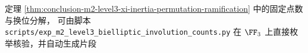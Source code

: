 \begin{remark}[有限组合核验脚本]\label{rem:conclusion-m2-level3-xi-involution-audit-script}
定理 \ref{thm:conclusion-m2-level3-xi-inertia-permutation-ramification} 中的固定点数与换位分解，
可由脚本 \texttt{scripts/exp\_m2\_level3\_bielliptic\_involution\_counts.py} 在 \(\FF_3\) 上直接枚举核验，并自动生成片段

\end{remark}

